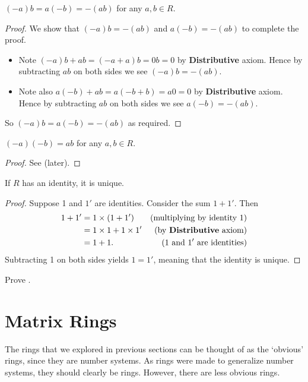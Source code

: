 \begin{proposition}\label{prop-product-of-element-and-additive-inverse-is-additive-inverse-of-product}
    $(-a)b = a(-b) = -(ab)$ for any $a, b \in R$.
\end{proposition}
\begin{proof}
    We show that $(-a)b = -(ab)$ and $a(-b) = -(ab)$ to complete the proof.
    \begin{itemize}
        \item Note $(-a)b + ab = (-a + a)b = 0b = 0$ by \textbf{Distributive} axiom. Hence by subtracting $ab$ on both sides we see $(-a)b = -(ab)$.
        \item Note also $a(-b) + ab = a(-b + b) = a0 = 0$ by \textbf{Distributive} axiom. Hence by subtracting $ab$ on both sides we see $a(-b) = -(ab)$.
    \end{itemize}
    So $(-a)b = a(-b) = -(ab)$ as required.
\end{proof}

\begin{proposition}\label{prop-product-of-additive-inverses}
    $(-a)(-b) = ab$ for any $a, b \in R$.
\end{proposition}
\begin{proof}
    See  (later).
\end{proof}

\begin{proposition}
    If $R$ has an identity, it is unique.
\end{proposition}
\begin{proof}
    Suppose 1 and $1'$ are identities. Consider the sum $1 + 1'$. Then
    \begin{align*}
        1 + 1' &= 1\times(1+1') & (\text{multiplying by identity }1)\\
        &= 1\times1 + 1\times1' & (\text{by \textbf{Distributive} axiom})\\
        &= 1 + 1. & (1 \text{ and } 1' \text{ are identities})
    \end{align*}
    Subtracting 1 on both sides yields $1 = 1'$, meaning that the identity is unique.
\end{proof}

\begin{exercise}\label{exercise-product-of-additive-inverses}
    Prove .
\end{exercise}

\section{Matrix Rings}
The rings that we explored in previous sections can be thought of as the `obvious' rings, since they are number systems. As rings were made to generalize number systems, they should clearly be rings. However, there are less obvious rings.

